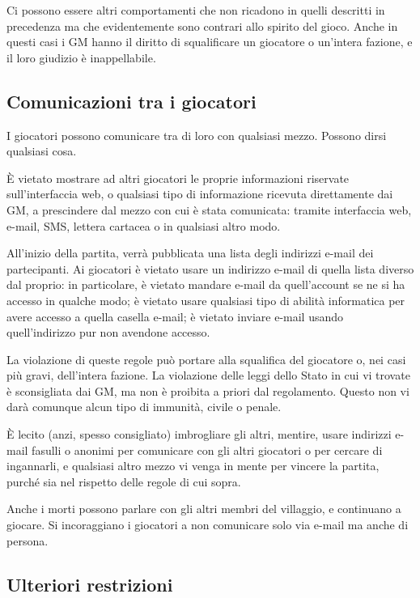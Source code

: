 \documentclass[a4paper,10pt]{article}
\begin{document}
Ci possono essere altri comportamenti che non ricadono in quelli descritti in precedenza ma
che evidentemente sono contrari allo spirito del gioco. Anche in questi casi i GM
hanno il diritto di squalificare un giocatore o un'intera fazione, e il loro giudizio è inappellabile.


\subsection{Comunicazioni tra i giocatori}

I giocatori possono comunicare tra di loro con qualsiasi mezzo. Possono dirsi
qualsiasi cosa.

È vietato mostrare ad altri giocatori le proprie informazioni riservate sull'interfaccia web, o qualsiasi
tipo di informazione ricevuta direttamente dai GM, a prescindere dal mezzo con 
cui è stata comunicata: tramite interfaccia web, e-mail, SMS, lettera cartacea
o in qualsiasi altro modo.

All'inizio della partita, verrà pubblicata una lista degli indirizzi e-mail dei
partecipanti. Ai giocatori è vietato usare un indirizzo e-mail
di quella lista diverso dal proprio: in particolare, è vietato mandare e-mail da
quell'account se ne si ha accesso in qualche modo; è vietato
usare qualsiasi tipo di abilità informatica per avere accesso a quella casella
e-mail; è vietato inviare e-mail usando quell'indirizzo pur non
avendone accesso.

La violazione di queste regole può portare alla squalifica
del giocatore o, nei casi più gravi, dell'intera fazione.
La violazione delle leggi dello Stato in cui vi trovate è sconsigliata dai GM,
ma non è proibita a priori dal regolamento. Questo non vi darà comunque alcun tipo di
immunità, civile o penale.

È lecito (anzi, spesso consigliato) imbrogliare gli altri, mentire, usare
indirizzi e-mail fasulli o anonimi per comunicare con gli altri giocatori o per
cercare di ingannarli, e qualsiasi altro mezzo vi venga in mente per vincere la
partita, purché sia nel rispetto delle regole di cui sopra.

Anche i morti possono parlare con gli altri membri del villaggio, e continuano a
giocare. Si incoraggiano i giocatori a non comunicare solo via e-mail ma anche
di persona.


\subsection{Ulteriori restrizioni}
\end{document}
